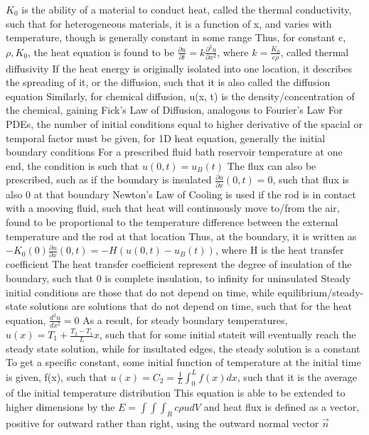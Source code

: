 \documentclass[11 pt, twoside]{article}
\newenvironment{outline*}
{
	\begin{outline}[enumerate]
	}
	{\end{outline}
}
\begin{document}
\begin{outline*}
		\3 $K_0$ is the ability of a material to conduct heat, called the thermal conductivity, such that for heterogeneous materials, it is a function of x, and varies with temperature, though is generally constant in some range
		\3 Thus, for constant c, $\rho, K_0$, the heat equation is found to be $\frac{\partial u}{\partial t} = k\frac{\partial^2 u}{\partial x^2}$, where $k = \frac{K_0}{c\rho}$, called thermal diffusivity
	\2 If the heat energy is originally isolated into one location, it describes the spreading of it, or the diffusion, such that it is also called the diffusion equation
		\3 Similarly, for chemical diffusion, u(x, t) is the density/concentration of the chemical, gaining Fick's Law of Diffusion, analogous to Fourier's Law
\1 For PDEs, the number of initial conditions equal to higher derivative of the spacial or temporal factor must be given, for 1D heat equation, generally the initial boundary conditions
	\2 For a prescribed fluid bath reservoir temperature at one end, the condition is such that $u(0, t) = u_B(t)$
	\2 The flux can also be prescribed, such as if the boundary is insulated $\frac{\partial u}{\partial x}(0, t) = 0$, such that flux is also 0 at that boundary
	\2 Newton's Law of Cooling is used if the rod is in contact with a mooving fluid, such that heat will continuously move to/from the air, found to be proportional to the temperature difference between the external temperature and the rod at that location
		\3 Thus, at the boundary, it is written as $-K_0(0)\frac{\partial u}{\partial x}(0, t) = -H(u(0, t) - u_B(t))$, where H is the heat transfer coefficient
		\3 The heat transfer coefficient represent the degree of insulation of the boundary, such that 0 is complete insulation, to infinity for uninsulated
\1 Steady initial conditions are those that do not depend on time, while equilibrium/steady-state solutions are solutions that do not depend on time, such that for the heat equation, $\frac{d^2u}{dx^2} = 0$
	\2 As a result, for steady boundary temperatures, $u(x) = T_1 + \frac{T_2 - T_1}{L}x$, such that for some initial stateit will eventually reach the steady state solution, while for insultated edges, the steady solution is a constant
		\3 To get a specific constant, some initial function of temperature at the initial time is given, f(x), such that $u(x) = C_2 = \frac{1}{L} \int^L_0 f(x)dx$, such that it is the average of the initial temperature distribution
\1 This equation is able to be extended to higher dimensions by the $E = \int \int \int_R c\rho u dV$ and heat flux is defined as a vector, positive for outward rather than right, using the outward normal vector $\vec{n}$

\end{outline*}
\end{document}
